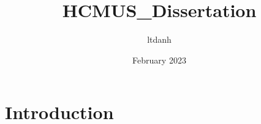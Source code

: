\documentclass{article}
\title{HCMUS_Dissertation}
\author{ltdanh }
\date{February 2023}
\begin{document}
\maketitle

\section{Introduction}
\end{document}
